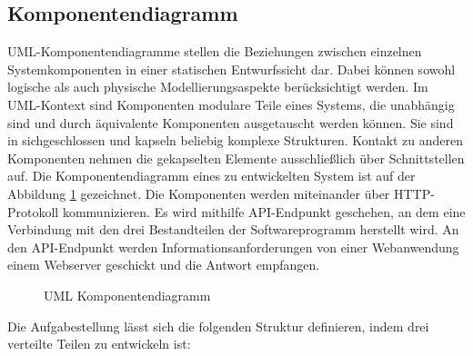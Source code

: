 \subsection{Komponentendiagramm}
\label{sec:design:uml:uml_component}
UML-Komponentendiagramme stellen die Beziehungen zwischen einzelnen Systemkomponenten in einer statischen Entwurfssicht dar. Dabei können sowohl logische als auch physische Modellierungsaspekte berücksichtigt werden. Im UML-Kontext sind Komponenten modulare Teile eines Systems, die unabhängig sind und durch äquivalente Komponenten ausgetauscht werden können. Sie sind in sichgeschlossen und kapseln beliebig komplexe Strukturen. Kontakt zu anderen Komponenten nehmen die gekapselten Elemente ausschließlich über Schnittstellen auf\cite{website:20}. Die Komponentendiagramm eines zu entwickelten System ist auf der Abbildung \ref{fig:components} gezeichnet. Die Komponenten werden miteinander über HTTP-Protokoll kommunizieren. Es wird mithilfe API-Endpunkt geschehen, an dem eine Verbindung mit den drei Bestandteilen der Softwareprogramm herstellt wird. An den API-Endpunkt werden Informationsanforderungen von einer Webanwendung einem Webserver geschickt und die Antwort empfangen.
\begin{figure}
	\centering
	\caption{UML Komponentendiagramm}
	\label{fig:components}
\end{figure}
Die Aufgabestellung lässt sich die folgenden Struktur definieren, indem drei verteilte Teilen zu entwickeln ist:
